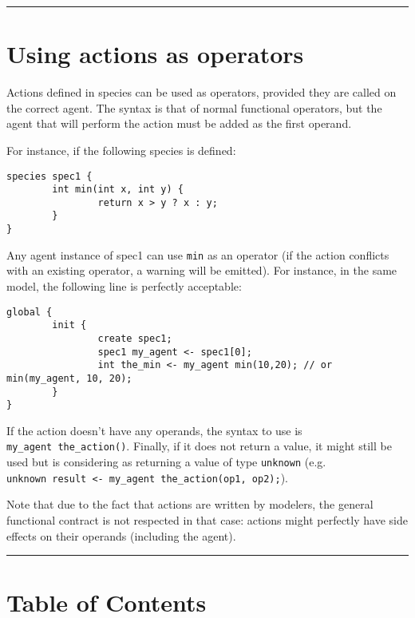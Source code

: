 \documentclass[]{book}
\theoremstyle{definition}
\theoremstyle{definition}
\theoremstyle{definition}
\theoremstyle{remark}
\begin{document}
\begin{center}\rule{0.5\linewidth}{\linethickness}\end{center}

\section{Using actions as operators}\label{using-actions-as-operators-4}

Actions defined in species can be used as operators, provided they are
called on the correct agent. The syntax is that of normal functional
operators, but the agent that will perform the action must be added as
the first operand.

For instance, if the following species is defined:

\begin{verbatim}
species spec1 {
        int min(int x, int y) {
                return x > y ? x : y;
        }
}
\end{verbatim}

Any agent instance of spec1 can use \texttt{min} as an operator (if the
action conflicts with an existing operator, a warning will be emitted).
For instance, in the same model, the following line is perfectly
acceptable:

\begin{verbatim}
global {
        init {
                create spec1;
                spec1 my_agent <- spec1[0];
                int the_min <- my_agent min(10,20); // or min(my_agent, 10, 20);
        }
}
\end{verbatim}

If the action doesn't have any operands, the syntax to use is
\texttt{my\_agent\ the\_action()}. Finally, if it does not return a
value, it might still be used but is considering as returning a value of
type \texttt{unknown} (e.g.
\texttt{unknown\ result\ \textless{}-\ my\_agent\ the\_action(op1,\ op2);}).

Note that due to the fact that actions are written by modelers, the
general functional contract is not respected in that case: actions might
perfectly have side effects on their operands (including the agent).

\begin{center}\rule{0.5\linewidth}{\linethickness}\end{center}

\section{Table of Contents}\label{table-of-contents-4}
\end{document}
